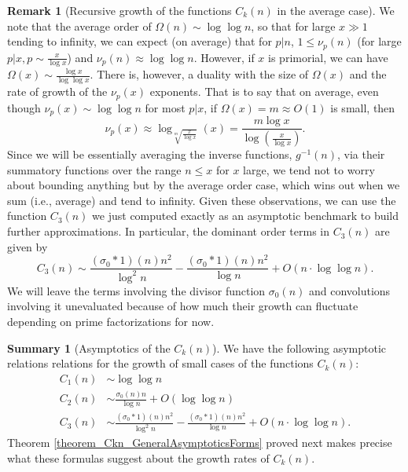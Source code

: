 \documentclass[11pt,reqno,a4letter]{article}
\numberwithin{figure}{section}
\numberwithin{table}{section}
\theoremstyle{plain}
\numberwithin{theorem}{section}
\theoremstyle{definition}
\newtheorem{remark}[theorem]{Remark}
\newtheorem{summary}[theorem]{Summary}
\begin{document}
\begin{remark}[Recursive growth of the functions $C_k(n)$ in the average case]
We note that the average order of $\Omega(n) \sim \log\log n$, so that for large $x \gg 1$ tending to 
infinity, we can expect (on average) that for $p|n$, $1 \leq \nu_p(n)$ (for large $p|x, p \sim \frac{x}{\log x}$) 
and $\nu_p(n) \approx \log\log n$. However, if $x$ is primorial, we can have 
$\Omega(x) \sim \frac{\log x}{\log\log x}$. There is, however, a duality with the size of $\Omega(x)$ and the 
rate of growth of the $\nu_p(x)$ exponents. That is to say that on average, 
even though $\nu_p(x) \sim \log\log n$ for most $p|x$, if $\Omega(x) = m \approx O(1)$ is small, then 
\[
\nu_p(x) \approx \log_{\sqrt[m]{\frac{x}{\log x}}}(x) = \frac{m \log x}{\log\left(\frac{x}{\log x}\right)}. 
\]
Since we will be essentially averaging the inverse functions, $g^{-1}(n)$, via their summatory functions 
over the range $n \leq x$ for $x$ large, we tend not to worry about bounding anything but by the 
average order case, which wins out when we sum (i.e., average) and tend to infinity. 
Given these observations, we can use the function $C_3(n)$ we just computed exactly 
as an asymptotic benchmark to build further approximations. In particular, the dominant order terms in 
$C_3(n)$ are given by 
\[
C_3(n) \sim \frac{(\sigma_0 \ast 1)(n) n^2}{\log^2 n} - 
     \frac{(\sigma_0 \ast 1)(n) n^2}{\log n} + 
     O\left(n \cdot \log\log n\right). 
\]
We will leave the terms involving the divisor function $\sigma_0(n)$ and convolutions 
involving it unevaluated because of how much their growth can fluctuate depending on prime 
factorizations for now. 
\end{remark} 

\begin{summary}[Asymptotics of the $C_k(n)$]
We have the following asymptotic relations relations for the growth of small cases of 
the functions $C_k(n)$: 
\begin{align*} 
C_1(n) & \sim \log\log n \\ 
C_2(n) & \sim \frac{\sigma_0(n) n}{\log n} + O(\log\log n) \\ 
C_3(n) & \sim \frac{(\sigma_0 \ast 1)(n) n^2}{\log^2 n} - 
     \frac{(\sigma_0 \ast 1)(n) n^2}{\log n} + 
     O\left(n \cdot \log\log n\right). 
\end{align*} 
Theorem \ref{theorem_Ckn_GeneralAsymptoticsForms} proved next 
makes precise what these formulas suggest about the growth rates of 
$C_k(n)$. 
\end{summary} 
\end{document}
